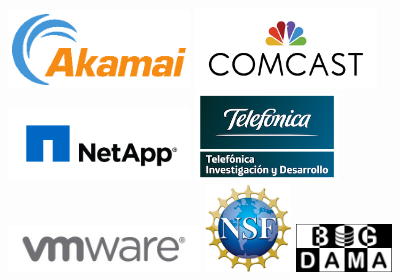 \documentclass[sigconf]{acmart}
\begin{document}
\begin{center}
\includegraphics[width=1.9in]{akamai.png}
\hspace{0.2in}
\includegraphics[width=1.9in]{comcast.jpg}
\hspace{0.2in}
\includegraphics[width=1.9in]{netapp.jpeg}
\hspace{0.2in}
\includegraphics[width=1.5in]{telefonica.png}
\hspace{0.2in}
\includegraphics[width=2in]{vmware.jpg}
\hspace{0.2in}
\includegraphics[width=0.9in]{nsf.jpg}
\hspace{0.2in}
\includegraphics[width=1in]{bigdama.jpg}

\end{center}
\end{document}
